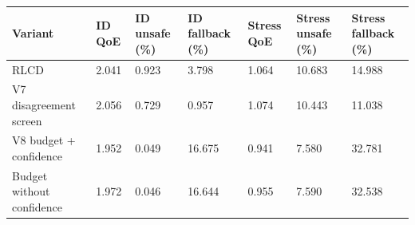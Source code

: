 \begin{tabular}{lllllll}
\toprule
Variant & ID QoE & ID unsafe (\%) & ID fallback (\%) & Stress QoE & Stress unsafe (\%) & Stress fallback (\%) \\
\midrule
RLCD & 2.041 & 0.923 & 3.798 & 1.064 & 10.683 & 14.988 \\
V7 disagreement screen & 2.056 & 0.729 & 0.957 & 1.074 & 10.443 & 11.038 \\
V8 budget + confidence & 1.952 & 0.049 & 16.675 & 0.941 & 7.580 & 32.781 \\
Budget without confidence & 1.972 & 0.046 & 16.644 & 0.955 & 7.590 & 32.538 \\
\bottomrule
\end{tabular}

